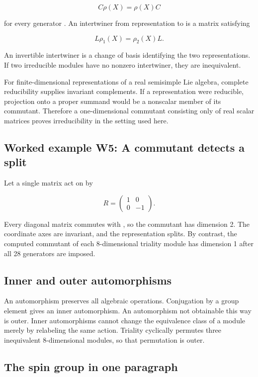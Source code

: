 \documentclass[11pt]{article}
\begin{document}
\[
C\rho(X)=\rho(X)C
\]

for every generator \texttt{}. An intertwiner from representation \texttt{} to \texttt{} is a matrix \texttt{} satisfying

\[
L\rho_1(X)=\rho_2(X)L.
\]

An invertible intertwiner is a change of basis identifying the two representations. If two irreducible modules have no nonzero intertwiner, they are inequivalent.

For finite-dimensional representations of a real semisimple Lie algebra, complete reducibility supplies invariant complements. If a representation were reducible, projection onto a proper summand would be a nonscalar member of its commutant. Therefore a one-dimensional commutant consisting only of real scalar matrices proves irreducibility in the setting used here.

\subsection{Worked example W5: A commutant detects a split}

Let a single matrix act on \texttt{} by

\[
R=\begin{pmatrix}1&0\\0&-1\end{pmatrix}.
\]

Every diagonal matrix commutes with \texttt{}, so the commutant has dimension 2. The coordinate axes are invariant, and the representation splits. By contrast, the computed commutant of each 8-dimensional triality module has dimension 1 after all 28 generators are imposed.

\subsection{Inner and outer automorphisms}

An automorphism preserves all algebraic operations. Conjugation by a group element gives an inner automorphism. An automorphism not obtainable this way is outer. Inner automorphisms cannot change the equivalence class of a module merely by relabeling the same action. Triality cyclically permutes three inequivalent 8-dimensional modules, so that permutation is outer.

\subsection{The spin group in one paragraph}
\end{document}
